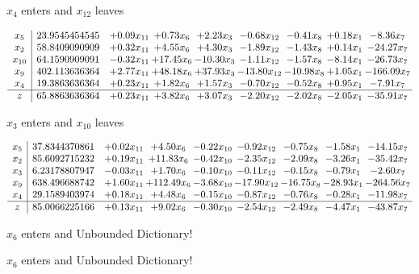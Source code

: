 \documentclass[9pt]{article}
\begin{document}
 $ x_{4} $ enters and $ x_{12} $ leaves 

 \[\begin{array}{c| c c@{\hskip 2pt} c@{\hskip 2pt} c@{\hskip 2pt} c@{\hskip 2pt} c@{\hskip 2pt} c@{\hskip 2pt} c@{\hskip 2pt} }
 x_{5}   &  23.9545454545 & +  0.09 x_{11} & +  0.73 x_{6} & +  2.23 x_{3} & -0.68 x_{12} & -0.41 x_{8} & +  0.18 x_{1} & -8.36 x_{7}\\
 x_{2}   &  58.8409090909 & +  0.32 x_{11} & +  4.55 x_{6} & +  4.30 x_{3} & -1.89 x_{12} & -1.43 x_{8} & +  0.14 x_{1} & -24.27 x_{7}\\
 x_{10}   &  64.1590909091 & -0.32 x_{11} & + 17.45 x_{6} & -10.30 x_{3} & -1.11 x_{12} & -1.57 x_{8} & -8.14 x_{1} & -26.73 x_{7}\\
 x_{9}   &  402.113636364 & +  2.77 x_{11} & + 48.18 x_{6} & + 37.93 x_{3} & -13.80 x_{12} & -10.98 x_{8} & +  1.05 x_{1} & -166.09 x_{7}\\
 x_{4}   &  19.3863636364 & +  0.23 x_{11} & +  1.82 x_{6} & +  1.57 x_{3} & -0.70 x_{12} & -0.52 x_{8} & +  0.95 x_{1} & -7.91 x_{7}\\
\hline
z    &  65.8863636364 & +  0.23 x_{11} & +  3.82 x_{6} & +  3.07 x_{3} & -2.20 x_{12} & -2.02 x_{8} & -2.05 x_{1} & -35.91 x_{7}\\
\end{array}\]


 $ x_{3} $ enters and $ x_{10} $ leaves 

 \[\begin{array}{c| c c@{\hskip 2pt} c@{\hskip 2pt} c@{\hskip 2pt} c@{\hskip 2pt} c@{\hskip 2pt} c@{\hskip 2pt} c@{\hskip 2pt} }
 x_{5}   &  37.8344370861 & +  0.02 x_{11} & +  4.50 x_{6} & -0.22 x_{10} & -0.92 x_{12} & -0.75 x_{8} & -1.58 x_{1} & -14.15 x_{7}\\
 x_{2}   &  85.6092715232 & +  0.19 x_{11} & + 11.83 x_{6} & -0.42 x_{10} & -2.35 x_{12} & -2.09 x_{8} & -3.26 x_{1} & -35.42 x_{7}\\
 x_{3}   &  6.23178807947 & -0.03 x_{11} & +  1.70 x_{6} & -0.10 x_{10} & -0.11 x_{12} & -0.15 x_{8} & -0.79 x_{1} & -2.60 x_{7}\\
 x_{9}   &  638.496688742 & +  1.60 x_{11} & + 112.49 x_{6} & -3.68 x_{10} & -17.90 x_{12} & -16.75 x_{8} & -28.93 x_{1} & -264.56 x_{7}\\
 x_{4}   &  29.1589403974 & +  0.18 x_{11} & +  4.48 x_{6} & -0.15 x_{10} & -0.87 x_{12} & -0.76 x_{8} & -0.28 x_{1} & -11.98 x_{7}\\
\hline
z    &  85.0066225166 & +  0.13 x_{11} & +  9.02 x_{6} & -0.30 x_{10} & -2.54 x_{12} & -2.49 x_{8} & -4.47 x_{1} & -43.87 x_{7}\\
\end{array}\]


 $ x_{6} $ enters and Unbounded Dictionary!


 $ x_{6} $ enters and Unbounded Dictionary!
\end{document}
